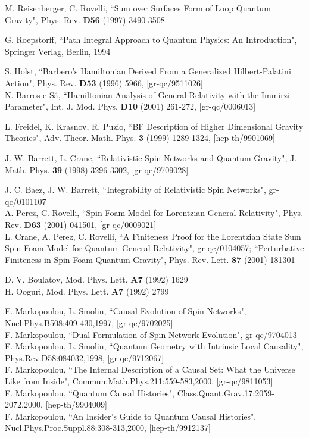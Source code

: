 \documentclass[12pt]{report}
\begin{document}
\begin{thebibliography}{99}
M. Reisenberger, C. Rovelli, ``Sum over Surfaces Form 
of Loop Quantum Gravity", Phys. Rev. {\bf D56} (1997) 3490-3508

 G. Roepstorff, ``Path Integral Approach to Quantum Physics:
An Introduction", Springer Verlag, Berlin, 1994

 S. Holst, ``Barbero's Hamiltonian Derived From a
Generalized Hilbert-Palatini Action", Phys. Rev. {\bf D53} (1996) 5966,
[gr-qc/9511026]\\
N. Barros e S\'a, ``Hamiltonian Analysis of General Relativity with the
Immirzi Parameter", Int. J. Mod. Phys. {\bf D10} (2001) 261-272,
[gr-qc/0006013]

 L. Freidel, K. Krasnov, R. Puzio,
``BF Description of Higher Dimensional Gravity Theories",
Adv. Theor. Math. Phys. {\bf 3} (1999) 1289-1324, [hep-th/9901069]

 J. W. Barrett, L. Crane, ``Relativistic Spin Networks and 
Quantum Gravity", J. Math. Phys. {\bf 39} (1998) 3296-3302, 
[gr-qc/9709028]

J. C. Baez, J. W. Barrett, ``Integrability of Relativistic Spin 
Networks", gr-qc/0101107\\
A. Perez, C. Rovelli, ``Spin Foam Model for Lorentzian General
Relativity", Phys. Rev. {\bf D63} (2001) 041501, [gr-qc/0009021]\\
L. Crane, A. Perez, C. Rovelli, ``A Finiteness Proof for the 
Lorentzian State Sum Spin Foam Model for Quantum General Relativity",
gr-qc/0104057; ``Perturbative Finiteness in Spin-Foam Quantum Gravity",
Phys. Rev. Lett. {\bf 87} (2001) 181301


 D. V. Boulatov, Mod. Phys. Lett. {\bf A7} (1992) 1629\\
H. Ooguri, Mod. Phys. Lett. {\bf A7} (1992) 2799

 F. Markopoulou, L. Smolin, ``Causal Evolution of Spin 
Networks", Nucl.Phys.B508:409-430,1997, [gr-qc/9702025]\\
F. Markopoulou, ``Dual Formulation of Spin Network Evolution",
gr-qc/9704013\\
F. Markopoulou, L. Smolin, ``Quantum Geometry with Intrinsic Local
Causality", Phys.Rev.D58:084032,1998, [gr-qc/9712067]\\ 
F. Markopoulou, ``The Internal Description of a Causal Set:
What the Universe Like from Inside", Commun.Math.Phys.211:559-583,2000,
[gr-qc/9811053]\\
F. Markopoulou, ``Quantum Causal Histories",
Class.Quant.Grav.17:2059-2072,2000, [hep-th/9904009] \\
F. Markopoulou, ``An Insider's Guide to Quantum Causal Histories",
Nucl.Phys.Proc.Suppl.88:308-313,2000, [hep-th/9912137]


\end{thebibliography}
\end{document}
